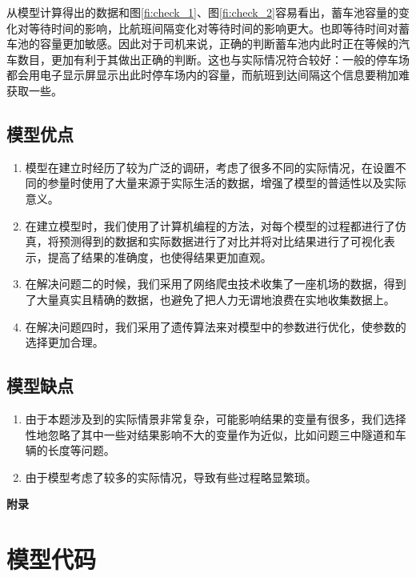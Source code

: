 \documentclass{cumcm}
\begin{document}
从模型计算得出的数据和图\ref{fi:check_1}、图\ref{fi:check_2}容易看出，蓄车池容量的变化对等待时间的影响，比航班间隔变化对等待时间的影响更大。也即等待时间对蓄车池的容量更加敏感。因此对于司机来说，正确的判断蓄车池内此时正在等候的汽车数目，更加有利于其做出正确的判断。这也与实际情况符合较好：一般的停车场都会用电子显示屏显示出此时停车场内的容量，而航班到达间隔这个信息要稍加难获取一些。
\subsection{模型优点}
\begin{enumerate}
	\item 模型在建立时经历了较为广泛的调研，考虑了很多不同的实际情况，在设置不同的参量时使用了大量来源于实际生活的数据，增强了模型的普适性以及实际意义。
	\item 在建立模型时，我们使用了计算机编程的方法，对每个模型的过程都进行了仿真，将预测得到的数据和实际数据进行了对比并将对比结果进行了可视化表示，提高了结果的准确度，也使得结果更加直观。
	\item 在解决问题二的时候，我们采用了网络爬虫技术收集了一座机场的数据，得到了大量真实且精确的数据，也避免了把人力无谓地浪费在实地收集数据上。
	\item 在解决问题四时，我们采用了遗传算法来对模型中的参数进行优化，使参数的选择更加合理。
\end{enumerate}
\subsection{模型缺点}
\begin{enumerate}
	\item 由于本题涉及到的实际情景非常复杂，可能影响结果的变量有很多，我们选择性地忽略了其中一些对结果影响不大的变量作为近似，比如问题三中隧道和车辆的长度等问题。
	\item 由于模型考虑了较多的实际情况，导致有些过程略显繁琐。
\end{enumerate}

\newpage


\newpage
\appendix
\textbf{附录}
\section{模型代码}
\end{document}
